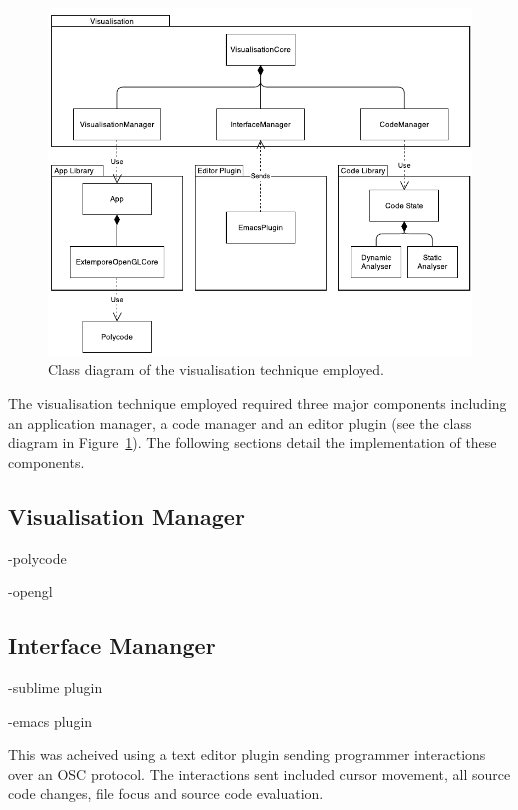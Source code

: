 \begin{figure}
  \centering \includegraphics[width=\columnwidth]{../images/diagrams/visualisation-class-diagram.pdf}
  \caption{Class diagram of the visualisation technique employed.}
\label{fig:visualisation-class-diagram}
\end{figure}

The visualisation technique employed required three major components including an application manager, a code manager and an editor plugin (see the class diagram in Figure~\ref{fig:visualisation-class-diagram}). The following sections detail the implementation of these components.

\subsection{Visualisation Manager}

-polycode~\cite{Safrin2013}

-opengl

\more

\subsection{Interface Mananger}
\label{sec:interface-manager}

-sublime plugin

-emacs plugin

This was acheived using a text editor plugin sending programmer interactions over an \ac{OSC} protocol. The interactions sent included cursor movement, all source code changes, file focus and source code evaluation.

